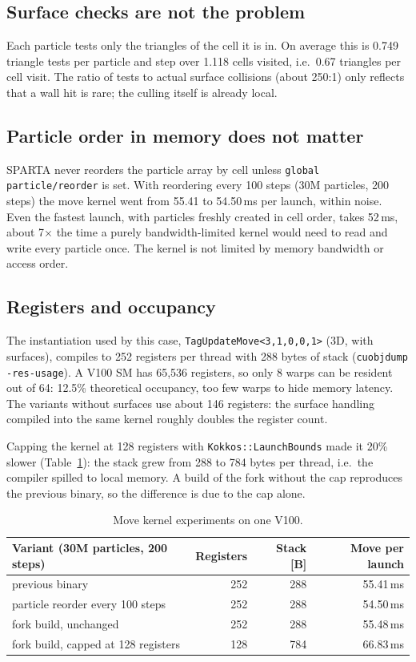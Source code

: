 \documentclass[11pt,a4paper]{article}
\newcommand{\code}[1]{\texttt{#1}}
\begin{document}
\subsection{Surface checks are not the problem}
Each particle tests only the triangles of the cell it is in. On average this is
0.749 triangle tests per particle and step over 1.118 cells visited, i.e.\ 0.67
triangles per cell visit. The ratio of tests to actual surface collisions
(about 250:1) only reflects that a wall hit is rare; the culling itself is
already local.

\subsection{Particle order in memory does not matter}
SPARTA never reorders the particle array by cell unless
\code{global particle/reorder} is set. With reordering every 100 steps
(30M particles, 200 steps) the move kernel went from 55.41 to 54.50\,ms per
launch, within noise. Even the fastest launch, with particles freshly created
in cell order, takes 52\,ms, about 7$\times$ the time a purely
bandwidth-limited kernel would need to read and write every particle once.
The kernel is not limited by memory bandwidth or access order.

\subsection{Registers and occupancy}
The instantiation used by this case, \code{TagUpdateMove<3,1,0,0,1>} (3D, with
surfaces), compiles to 252 registers per thread with 288 bytes of stack
(\code{cuobjdump -res-usage}). A V100 SM has 65,536 registers, so only 8 warps
can be resident out of 64: 12.5\% theoretical occupancy, too few warps to hide
memory latency. The variants without surfaces use about 146 registers: the
surface handling compiled into the same kernel roughly doubles the register
count.

Capping the kernel at 128 registers with \code{Kokkos::LaunchBounds} made it
20\% slower (Table~\ref{tab:move}): the stack grew from 288 to 784 bytes per
thread, i.e.\ the compiler spilled to local memory. A build of the fork
without the cap reproduces the previous binary, so the difference is due to
the cap alone.

\begin{table}[h]
\centering
\begin{tabular}{lrrr}
\toprule
Variant (30M particles, 200 steps) & Registers & Stack [B] & Move per launch \\
\midrule
previous binary                     & 252 & 288 & 55.41\,ms \\
particle reorder every 100 steps    & 252 & 288 & 54.50\,ms \\
fork build, unchanged               & 252 & 288 & 55.48\,ms \\
fork build, capped at 128 registers & 128 & 784 & 66.83\,ms \\
\bottomrule
\end{tabular}
\caption{Move kernel experiments on one V100.}
\label{tab:move}
\end{table}
\end{document}
